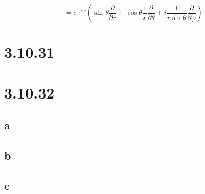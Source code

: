 \documentclass[12pt]{article}
\begin{document}
\[
    = e^{-i \varphi}
    \left(
    \sin{\theta} \frac{\partial}{\partial r} + \cos{\theta} \frac{1}{r} \frac{\partial}{\partial \theta}
    + i \frac{1}{r \sin{\theta}} \frac{\partial}{\partial \varphi}
    \right)
\]

\section{3.10.31}

\section{3.10.32}

\subsection{a}

\subsection{b}

\subsection{c}
\end{document}
